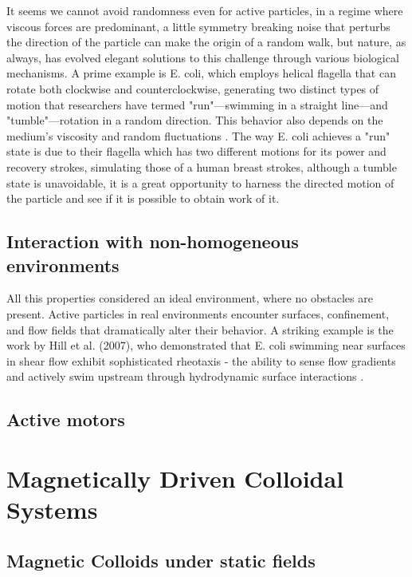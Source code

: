 It seems we cannot avoid randomness even for active particles, in a regime where viscous forces are predominant, a little symmetry breaking noise that perturbs the direction of the particle can make the origin of a random walk, but nature, as always, has evolved elegant solutions to this challenge through various biological mechanisms. A prime example is E. coli, which employs helical flagella that can rotate both clockwise and counterclockwise, generating two distinct types of motion that researchers have termed "run"—swimming in a straight line—and "tumble"—rotation in a random direction. This behavior also depends on the medium's viscosity and random fluctuations \cite{kumar2010physics}. The way E. coli achieves a "run" state is due to their flagella which has two different motions for its power and recovery strokes, simulating those of a human breast strokes, although a tumble state is unavoidable, it is a great opportunity to harness the directed motion of the particle and see if it is possible to obtain work of it. 


\section{Interaction with non-homogeneous environments}

All this properties considered an ideal environment, where no obstacles are present. Active particles in real environments encounter surfaces, confinement, and flow fields that dramatically alter their behavior. A striking example is the work by Hill et al. (2007), who demonstrated that E. coli swimming near surfaces in shear flow exhibit sophisticated rheotaxis - the ability to sense flow gradients and actively swim upstream through hydrodynamic surface interactions \cite{hill2007hydrodynamic}. 

\section{Active motors}


\chapter{Magnetically Driven Colloidal Systems}
\label{magneticallydrivencolloidalsystems}

\section{Magnetic Colloids under static fields}

